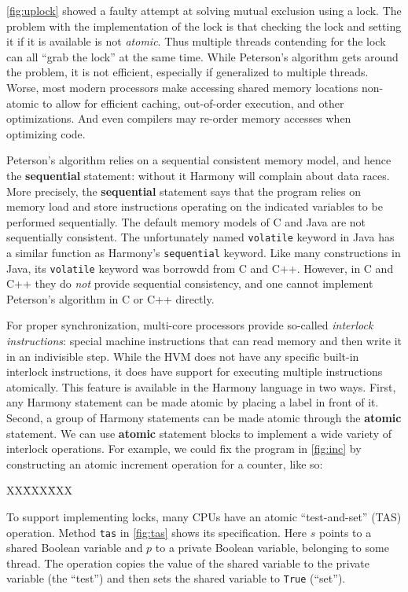 \documentclass{report}
\newcommand{\harmonysource}[1]{
\begin{tabbing}
XX\=XXX\=XXX\kill
    
\end{tabbing}
}
\newenvironment{code}{
\tcolorbox
}{
\endtcolorbox
}
\begin{document}
\autoref{fig:uplock} showed a faulty attempt at solving mutual
exclusion using a lock.  The problem with the implementation of the
lock is that checking the lock and setting it if it is available is
not \emph{atomic}.  Thus multiple threads contending for the lock
can all ``grab the lock'' at the same time.  While Peterson's
algorithm gets around the problem, it is not efficient, especially
if generalized to multiple threads.
Worse, most modern processors make accessing shared memory locations
non-atomic to allow for efficient caching, out-of-order execution,
and other optimizations.
And even compilers may re-order memory accesses when optimizing code.

Peterson's algorithm relies on a sequential consistent memory model,
and hence the \textbf{sequential} statement: without it Harmony will
complain about data races.
More precisely, the \textbf{sequential} statement says that the
program relies on memory load and store instructions operating on
the indicated variables to be performed sequentially.
The default memory models of C and Java are not sequentially
consistent.
The unfortunately named \texttt{volatile} keyword in Java has
a similar function as Harmony's \texttt{sequential} keyword.
Like many constructions in Java, its \texttt{volatile} keyword
was borrowdd from C and C++.
However, in C and C++ they do \emph{not} provide sequential
consistency, and one cannot implement Peterson's algorithm in
C or C++ directly.

%
For proper synchronization, multi-core processors provide so-called
\emph{interlock instructions}: %
special machine instructions
that can read memory and then write it in an indivisible step.
%
While the HVM does not have any specific built-in interlock instructions,
it does have support for executing multiple instructions atomically.
This feature is available in the Harmony language in two ways.
First, any Harmony statement can be made atomic by placing a label in front
of it.  Second, a group of Harmony statements can be made atomic
through the \textbf{atomic}
%
statement.
We can use \textbf{atomic} statement blocks to implement a wide variety of
interlock operations.
For example, we could fix the program in \autoref{fig:inc} by
constructing an atomic increment operation for a counter, like so:
\begin{code}
\harmonysource{atomicinc}
\end{code}

To support implementing locks,
many CPUs have an atomic ``test-and-set'' (TAS)
%
%
operation.
Method \texttt{tas} in \autoref{fig:tas} shows its specification.
Here $s$ points to a shared Boolean variable and $p$
to a private Boolean variable, belonging to some thread.
The operation copies the value of the shared variable to the
private variable (the ``test'')
and then sets the shared variable to \texttt{True} (``set'').
\end{document}
